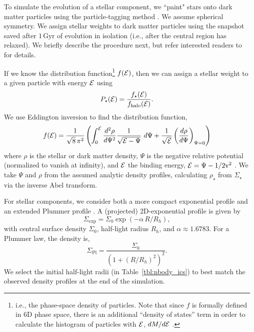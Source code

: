 \documentclass[times,trackchanges, twocolumn, twocolappendix]{aastex701}
\newcommand{\V}{\textrm{v}}
\newcommand{\Gyr}{\text{Gyr}}
\begin{document}
To simulate the evolution of a stellar component, we ``paint" stars onto dark matter particles using the particle-tagging
method \citep[e.g.,][]{bullock+johnston2005}. We assume spherical symmetry. We assign stellar weights to dark matter particles using the snapshot saved after $1\,\Gyr$ of evolution in isolation (i.e., after the central region has relaxed). We briefly describe the
procedure next, but refer interested readers to \citet{EP2020} for details.

If we know the distribution function\footnote{i.e., the phase-space density of
  particles. Note that since $f$ is formally defined in 6D phase
  space, there is an additional ``density of states'' term in order to
  calculate the histogram of particles with ${\cal E}$,
  $dM/d{\cal E}$ \citep[section 4.4.5,][]{BT1987}.} $f({\cal E})$,
then we can assign a stellar weight to a given particle with energy
${\cal E}$ using 
\begin{equation}
    P_\star({\cal E}) = \frac{f_\star({\cal E})}{f_\text{halo}({\cal E})}.
\end{equation}
We use Eddington inversion to find the distribution
function, \begin{equation}{
    f({\cal E}) = \frac{1}{\sqrt{8}\, \pi^2}\left( \int_0^{\cal E} \frac{d^2\rho}{d\Psi^2} \frac{1}{\sqrt{{\cal E} - \Psi}}\ d\Psi + \frac{1}{\sqrt{\cal E}} \left(\frac{d\rho}{d\Psi}\right)_{\Psi=0} \right)
}
\end{equation} 
where $\rho$ is the stellar or dark matter density, $\Psi$ is the negative relative potential (normalized to vanish at infinity), and
${\cal E}$ the binding energy, ${\cal E} = \Psi - 1/2 \V^2$  
\citep[see eq. 4-140b in][]{BT1987}. We
take $\Psi$ and $\rho$ from the assumed analytic density profiles, calculating $\rho_\star$ from $\Sigma_\star$ via the inverse Abel transform.

For stellar components, we consider both a more compact exponential profile and an extended Plummer profile \citep{plummer1911}.  A (projected) 2D-exponential profile is given by 
\begin{equation}\label{eq:exponential_law}
\Sigma_\text{exp} = \Sigma_0\exp(-\alpha\,R / R_h),
\end{equation}
with central surface density $\Sigma_0$, half-light radius $R_h$, and $\alpha \approx 1.6783$.
For a Plummer law, the density is,
\begin{equation}
\Sigma_\text{Pl} = \frac{\Sigma_0}{(1 + (R/R_h)^2)^2}. \label{EqPlummer}
\end{equation}
We select the initial half-light radii (in Table~\ref{tbl:nbody_ics}) to best match the observed density profiles at the end of the simulation.
\end{document}
